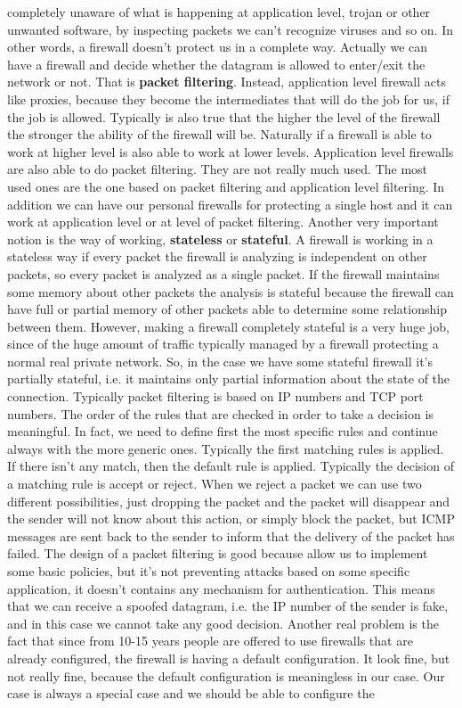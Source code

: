 \documentclass[11pt]{article}
\begin{document}
completely unaware of what is happening at application level, trojan or other unwanted software, by inspecting packets we can't recognize viruses and so on. In other words, a firewall doesn't protect us in a complete way. Actually we can have a firewall and decide whether the datagram is allowed to enter/exit the network or not. That is \textbf{packet filtering}. Instead, application level firewall acts like proxies, because they become the intermediates that will do the job for us, if the job is allowed. Typically is also true that the higher the level of the firewall the stronger the ability of the firewall will be. Naturally if a firewall is able to work at higher level is also able to work at lower levels. Application level firewalls are also able to do packet filtering. They are not really much used. The most used ones are the one based on packet filtering and application level filtering. In addition we can have our personal firewalls for protecting a single host and it can work at application level or at level of packet filtering. Another very important notion is the way of working, \textbf{stateless} or \textbf{stateful}. A firewall is working in a stateless way if every packet the firewall is analyzing is independent on other packets, so every packet is analyzed as a single packet. If the firewall maintains some memory about other packets the analysis is stateful because the firewall can have full or partial memory of other packets able to determine some relationship between them. However, making a firewall completely stateful is a very huge job, since of the huge amount of traffic typically managed by a firewall protecting a normal real private network. So, in the case we have some stateful firewall it's partially stateful, i.e. it maintains only partial information about the state of the connection. Typically packet filtering is based on IP numbers and TCP port numbers. The order of the rules that are checked in order to take a decision is meaningful. In fact, we need to define first the most specific rules and continue always with the more generic ones. Typically the first matching rules is applied. If there isn't any match, then the default rule is applied. Typically the decision of a matching rule is accept or reject. When we reject a packet we can use two different possibilities, just dropping the packet and the packet will disappear and the sender will not know about this action, or simply block the packet, but ICMP messages are sent back to the sender to inform that the delivery of the packet has failed. The design of a packet filtering is good because allow us to implement some basic policies, but it's not preventing attacks based on some specific application, it doesn't contains any mechanism for authentication. This means that we can receive a spoofed datagram, i.e. the IP number of the sender is fake, and in this case we cannot take any good decision. Another real problem is the fact that since from 10-15 years people are offered to use firewalls that are already configured, the firewall is having a default configuration. It look fine, but not really fine, because the default configuration is meaningless in our case. Our case is always a special case and we should be able to configure the 
\end{document}
